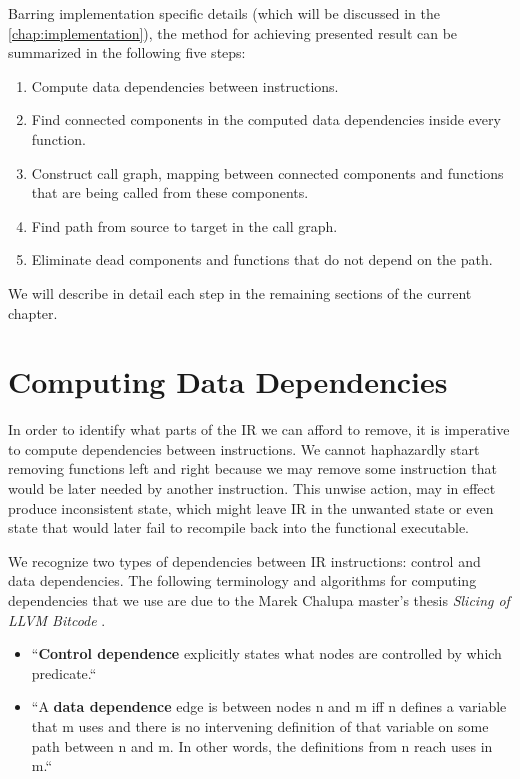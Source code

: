 \documentclass[12pt, twoside]{fithesis2}
\renewcommand{\_}{\leavevmode \kern0.07em\vbox{\hrule width0.4em}}
\newcommand{\squarebullet}{\textcolor{black}{\raisebox{0.15em}{\rule{4pt}{4pt}}}}
\newenvironment{myItemize}{
  \begin{itemize}[
    leftmargin=2em,
    rightmargin=1em,
    itemsep=\parskip,
    parsep=0em,
    topsep=0em,
    partopsep=0em
]
  \renewcommand{\labelitemi}{\squarebullet}
  \renewcommand{\labelitemii}{\textbullet}
}{
  \end{itemize}
}
\newenvironment{myEnumerate}{
  \begin{enumerate}[
    leftmargin=2em,
    rightmargin=1em,
    itemsep=\parskip,
    parsep=0em,
    topsep=0em,
    partopsep=0em
]
}{
  \end{enumerate}
}
\begin{document}
\bigskip
Barring implementation specific details (which will be discussed in the
\autoref{chap:implementation}), the method for achieving presented result can be
summarized in the following five steps:

\begin{myEnumerate}
\item Compute data dependencies between instructions.
\item Find connected components in the computed data dependencies inside
every function.
\item Construct call graph, mapping between connected components and functions
that are being called from these components.
\item Find path from source to target in the call graph.
\item Eliminate dead components and functions that do not depend on the path.
\end{myEnumerate}

We will describe in detail each step in the remaining sections of the current
chapter.

\section{Computing Data Dependencies}
\label{sec:design-dep}

In order to identify what parts of the IR we can afford to remove, it is
imperative to compute dependencies between instructions. We cannot haphazardly
start removing functions left and right because we may remove some instruction
that would be later needed by another instruction.
This unwise action, may in effect produce inconsistent state, which might leave
IR in the unwanted state or even state that would later fail to recompile back
into the functional executable.

We recognize two types of dependencies between IR instructions: control and data
dependencies.
The following terminology and algorithms for computing dependencies that we use
are due to the Marek Chalupa master's thesis \textit{Slicing of LLVM Bitcode}
\cite{dg}.

\begin{myItemize}
\item ``\textbf{Control dependence} explicitly states what nodes are
controlled by which predicate.``
\item ``A \textbf{data dependence} edge is between nodes n and
m iff n defines a variable that m uses and there is no intervening definition
of that variable on some path between n and m. In other words, the definitions
from n reach uses in m.``
\end{myItemize}
\end{document}
